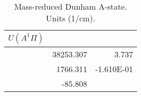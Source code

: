 \begin{table}[h]
\begin{tabular}{crr}
\toprule
$U (A^1\Pi)$\\ \midrule 
& 38253.307 & 3.737 \\
& 1766.311 & -1.610E-01 \\
& -85.808 \\
\bottomrule
\end{tabular}\caption{Mass-reduced Dunham A-state. Units (1/cm).}\end{table}
